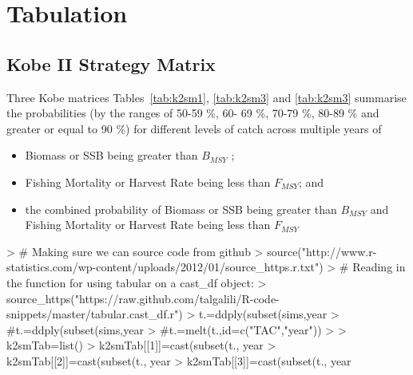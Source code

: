 \documentclass[shortnames,nojss,article]{jss}
\begin{document}
\section{Tabulation}

\subsection{Kobe II Strategy Matrix}

Three Kobe matrices Tables~\ref{tab:k2sm1}, \ref{tab:k2sm3} and \ref{tab:k2sm3} summarise the probabilities (by the ranges 
of 50-59 \%, 60- 69 \%, 70-79 \%, 80-89 \% and greater or equal to 90 \%) for different levels of catch across multiple years of 

\begin{itemize}
 \item  Biomass or SSB being greater than $B_{MSY}$ ;
 \item  Fishing Mortality or Harvest Rate being less than $F_{MSY}$; and 
 \item  the combined probability of Biomass or SSB being greater than $B_{MSY}$ and Fishing Mortality or Harvest Rate being less than $F_{MSY}$ 
\end{itemize}

\begin{Schunk}
\begin{Sinput}
> # Making sure we can source code from github
> source("http://www.r-statistics.com/wp-content/uploads/2012/01/source_https.r.txt")
> # Reading in the function for using tabular on a cast_df object:
> source_https("https://raw.github.com/talgalili/R-code-snippets/master/tabular.cast_df.r")
> t.=ddply(subset(sims,year %
> #t.=ddply(subset(sims,year %
> #t.=melt(t.,id=c("TAC","year"))
> 
> k2smTab=list()
> k2smTab[[1]]=cast(subset(t., year %
> k2smTab[[2]]=cast(subset(t., year %
> k2smTab[[3]]=cast(subset(t., year %
\end{Sinput}
\end{Schunk}
\end{document}
